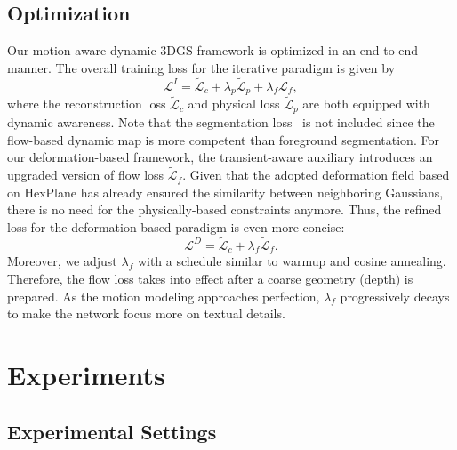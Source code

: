 \documentclass[runningheads]{llncs}
\begin{document}
\subsection{Optimization}
\label{sec:train}

Our motion-aware dynamic 3DGS framework is optimized in an end-to-end manner. The overall training loss for the iterative paradigm is given by
%
\begin{equation}
    \mathcal{L}^{I}=\widetilde{\mathcal{L}}_c + \lambda_{p} \widetilde{\mathcal{L}}_{p} + \lambda_{f} \mathcal{L}_{f},
\end{equation}
%
where the reconstruction loss $\widetilde{\mathcal{L}}_c$ and physical loss $\widetilde{\mathcal{L}}_{p}$ are both equipped with dynamic awareness. Note that the segmentation loss~\cite{d3dgs} is not included since the flow-based dynamic map is more competent than foreground segmentation.
%
For our deformation-based framework, the transient-aware auxiliary introduces an upgraded version of flow loss $\widetilde{\mathcal{L}}_{f}$. Given that the adopted deformation field based on HexPlane has already ensured the similarity between neighboring Gaussians, there is no need for the physically-based constraints anymore. Thus, the refined loss for the deformation-based paradigm is even more concise:
%
\begin{equation}
    \mathcal{L}^{D}=\widetilde{\mathcal{L}}_c + \lambda_{f} \widetilde{\mathcal{L}}_{f}.
\end{equation}
%
Moreover, we adjust $\lambda_{f}$ with a schedule similar to warmup and cosine annealing. Therefore, the flow loss takes into effect after a coarse geometry (depth) is prepared. As the motion modeling approaches perfection, $\lambda_{f}$ progressively decays to make the network focus more on textual details.


\section{Experiments}
\label{sec:exp}

\subsection{Experimental Settings}
\end{document}
